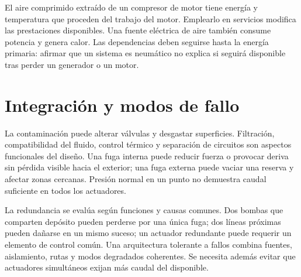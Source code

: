 El aire comprimido extraído de un compresor de motor tiene energía y temperatura que proceden del trabajo del motor. Emplearlo en servicios modifica las prestaciones disponibles. Una fuente eléctrica de aire también consume potencia y genera calor. Las dependencias deben seguirse hasta la energía primaria: afirmar que un sistema es neumático no explica si seguirá disponible tras perder un generador o un motor.

\section{Integración y modos de fallo}
La contaminación puede alterar válvulas y desgastar superficies. Filtración, compatibilidad del fluido, control térmico y separación de circuitos son aspectos funcionales del diseño. Una fuga interna puede reducir fuerza o provocar deriva sin pérdida visible hacia el exterior; una fuga externa puede vaciar una reserva y afectar zonas cercanas. Presión normal en un punto no demuestra caudal suficiente en todos los actuadores.

La redundancia se evalúa según funciones y causas comunes. Dos bombas que comparten depósito pueden perderse por una única fuga; dos líneas próximas pueden dañarse en un mismo suceso; un actuador redundante puede requerir un elemento de control común. Una arquitectura tolerante a fallos combina fuentes, aislamiento, rutas y modos degradados coherentes. Se necesita además evitar que actuadores simultáneos exijan más caudal del disponible.

